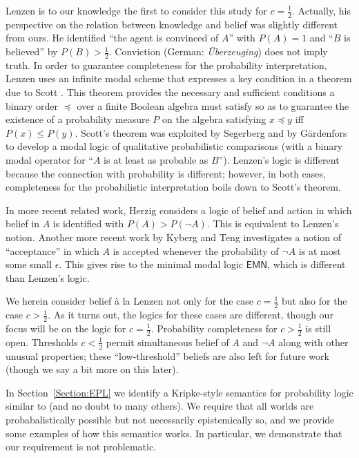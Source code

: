 \documentclass[12pt]{article}
\theoremstyle{definition}
\begin{document}
Lenzen \cite{Lenzen2003:kbasp,Lenzen1980:gwuw} is to our knowledge the
first to consider this study for $c=\frac 12$. Actually, his
perspective on the relation between knowledge and belief was slightly
different from ours.  He identified ``the agent is convinced of $A$''
with $P(A)=1$ and ``$B$ is believed'' by $P(B)>\frac 12$. Conviction
(German: \emph{\"{U}berzeuging}) does not imply truth.  In order to
guarantee completeness for the probability interpretation, Lenzen uses
an infinite modal scheme that expresses a key condition in a theorem
due to Scott \cite{Sco64:JMP}.  This theorem provides the necessary
and sufficient conditions a binary order $\preceq$ over a finite
Boolean algebra must satisfy so as to guarantee the existence of a
probability measure $P$ on the algebra satisfying $x\preceq y$ iff
$P(x)\leq P(y)$.  Scott's theorem was exploited by Segerberg
\cite{Segerberg1971:qpiams} and by G{\"a}rdenfors \cite{Gardenfors75}
to develop a modal logic of qualitative probabilistic comparisons
(with a binary modal operator for ``$A$ is at least as probable as
$B$'').  Lenzen's logic is different because the connection with
probability is different; however, in both cases, completeness for the
probabilistic interpretation boils down to Scott's theorem.

In more recent related work, Herzig \cite{Herzig2003:mpbaa} considers
a logic of belief and action in which belief in $A$ is identified with
$P(A)>P(\lnot A)$. This is equivalent to Lenzen's notion.  Another
more recent work by Kyberg and Teng \cite{KyburgTeng2012:tlorkr}
investigates a notion of ``acceptance'' in which $A$ is accepted
whenever the probability of $\lnot A$ is at most some small
$\epsilon$.  This gives rise to the minimal modal logic
$\mathsf{EMN}$, which is different than Lenzen's logic.

We herein consider belief \`{a} la Lenzen not only for the case
$c=\frac 12$ but also for the case $c>\frac 12$.  As it turns out, the
logics for these cases are different, though our focus will be on the
logic for $c=\frac 12$.  Probability completeness for $c>\frac 12$ is
still open.  Thresholds $c<\frac 12$ permit simultaneous belief of $A$
and $\lnot A$ along with other unusual properties; these
``low-threshold'' beliefs are also left for future work (though we say
a bit more on this later).

In Section~\ref{Section:EPL} we identify a Kripke-style semantics for
probability logic similar to
\cite{EijckSchwarzentruber2014:epls,Halpern2003:rau} (and no doubt to
many others).  We require that all worlds are probabalistically
possible but not necessarily epistemically so, and we provide some
examples of how this semantics works.  In particular, we demonstrate
that our requirement is not problematic.
\end{document}
